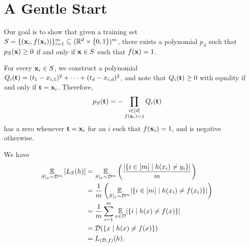 \chapter{A Gentle Start}

\begin{ex}
  Our goal is to show that given a training set
  $S=\{(\mathbf{x}_i, f(\mathbf{x}_i))\}_{i=1}^m\subseteq (\mathbb{R}^d\times \{0, 1\})^m$,
  there exists a polynomial $p_S$ such that $p_S(\mathbf{x})\geq 0$ if and only if
  $\mathbf{x}\in S$ such that $f(\mathbf{x})=1$.

  For every $\mathbf{x}_i\in S$, we construct a polynomial
  $Q_i(\mathbf{t})=(t_1-x_{i,1})^2+\cdots+(t_d-x_{i,d})^2$,
  and note that $Q_i(\mathbf{t})\geq 0$ with equality if and only if
  $\mathbf{t}=\mathbf{x}_i$. Therefore,
  \begin{align*}
    p_S(\mathbf{t})=-\prod_{\substack{i \in [d] \\ f(\mathbf{x}_i) = 1}}Q_i(\mathbf{t})
  \end{align*}
  has a zero whenever $\mathbf{t}=\mathbf{x}_i$ for an $i$ such that $f(\mathbf{x}_i)=1$, and is
  negative otherwise.
\end{ex}

\begin{ex}
  We have
  \begin{align*}
    \underset{S|_x \sim \mathcal{D}^m}{\mathbb{E}}\left[L_S(h)\right]
     & = \underset{S|_x \sim \mathcal{D}^m}{\mathbb{E}}
    \left(\frac{|\{i\in[m] \mid h(x_i)\neq y_i\}|}{m}\right) \\
     & = \frac{1}{m}\left(
    \underset{S|_x \sim \mathcal{D}^m}{\mathbb{E}}|\{i\in[m] \mid h(x_i)\neq f(x_i)\}|
    \right)                                                  \\
     & = \frac{1}{m}\sum_{i=1}^m\underset{x\in \mathcal{D}}{\mathbb{E}}
    |\{i \mid h(x)\neq f(x)\}|                               \\
     & = \mathcal{D}(\{x \mid h(x)\neq f(x) \})                       \\
     & = L_{(\mathcal{D}, f)}(h).
  \end{align*}
\end{ex}

